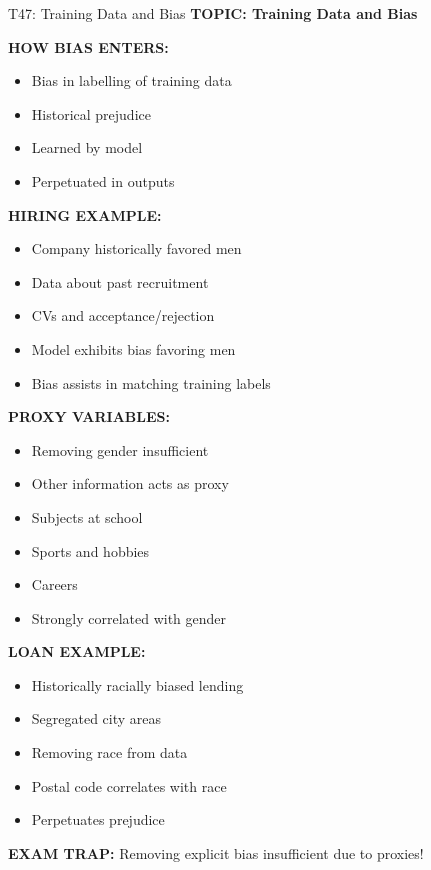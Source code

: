\documentclass[8pt]{beamer}
\begin{document}
	\begin{frame}{T47: Training Data and Bias}
		\fontsize{6.5}{7.5}\selectfont
		\textbf{TOPIC: Training Data and Bias}
		
		\vspace{0.1cm}
		\textbf{HOW BIAS ENTERS:}
		\begin{itemize}
			\item Bias in labelling of training data
			\item Historical prejudice
			\item Learned by model
			\item Perpetuated in outputs
		\end{itemize}
		
		\vspace{0.1cm}
		\textbf{HIRING EXAMPLE:}
		\begin{itemize}
			\item Company historically favored men
			\item Data about past recruitment
			\item CVs and acceptance/rejection
			\item Model exhibits bias favoring men
			\item Bias assists in matching training labels
		\end{itemize}
		
		\vspace{0.1cm}
		\textbf{PROXY VARIABLES:}
		\begin{itemize}
			\item Removing gender insufficient
			\item Other information acts as proxy
			\item Subjects at school
			\item Sports and hobbies
			\item Careers
			\item Strongly correlated with gender
		\end{itemize}
		
		\vspace{0.1cm}
		\textbf{LOAN EXAMPLE:}
		\begin{itemize}
			\item Historically racially biased lending
			\item Segregated city areas
			\item Removing race from data
			\item Postal code correlates with race
			\item Perpetuates prejudice
		\end{itemize}
		
		\textcolor{myred}{\textbf{EXAM TRAP:}} Removing explicit bias \textcolor{myblue}{insufficient} due to proxies!
	\end{frame}
	
\end{document}
